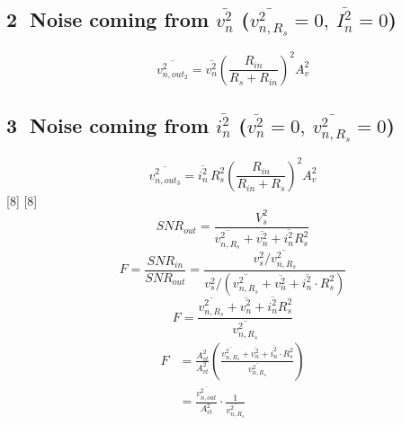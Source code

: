 \documentclass[11pt,a4paper]{article}
\begin{document}
\subsection*{\textcircled{2} Noise coming from $\overline{v_n^2}$ ($\overline{v_{n,R_s}^2}=0,\ \overline{I_n^2}=0$)}
\[ \overline{v_{n,out_2}^2} = \overline{v_n^2}\left(\frac{R_{in}}{R_s+R_{in}}\right)^2A_v^2 \]
\subsection*{\textcircled{3} Noise coming from $\overline{i_n^2}$ ($\overline{v_n^2}=0,\ \overline{v_{n,R_s}^2}=0$)}
\[ \overline{v_{n,out_3}^2} = \overline{i_n^2}\,R_s^2\left(\frac{R_{in}}{R_{in}+R_s}\right)^2A_v^2 \]
[8]
[8]
\[ SNR_{out} = \frac{V_s^2}{\overline{v_{n,R_s}^2} + \overline{v_n^2} + \overline{i_n^2}R_s^2} \]
\[ F = \frac{SNR_{in}}{SNR_{out}} = \frac{v_s^2/\overline{v_{n,R_s}^2}}{v_s^2\Big/\left(\overline{v_{n,R_s}^2}+\overline{v_n^2}+\overline{i_n^2}\cdot R_s^2\right)} \]
\[ F = \frac{\overline{v_{n,R_s}^2} + \overline{v_n^2} + \overline{i_n^2}R_s^2}{\overline{v_{n,R_s}^2}} \]
\begin{align*}
F &= \frac{A_{vt}^2}{A_{vt}^2}\left(\frac{\overline{v_{n,R_s}^2}+\overline{v_n^2}+\overline{i_n^2}\cdot R_s^2}{\overline{v_{n,R_s}^2}}\right)\\
&= \frac{\overline{v_{n,out}^2}}{A_{vt}^2}\cdot\frac{1}{\overline{v_{n,R_s}^2}}
\end{align*}

\end{document}
